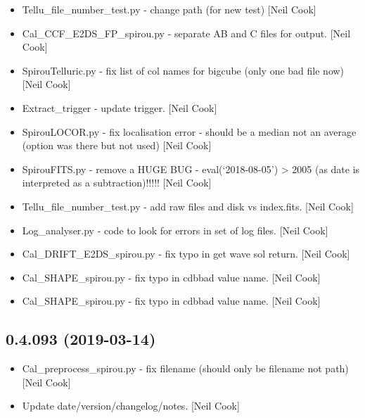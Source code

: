 \documentclass[a4paper,10pt,english]{report}
\begin{document}
\begin{itemize}
\item {} 
Tellu\_file\_number\_test.py - change path (for new test) {[}Neil Cook{]}

\item {} 
Cal\_CCF\_E2DS\_FP\_spirou.py - separate AB and C files for output. {[}Neil
Cook{]}

\item {} 
SpirouTelluric.py - fix list of col names for bigcube (only one bad
file now) {[}Neil Cook{]}

\item {} 
Extract\_trigger - update trigger. {[}Neil Cook{]}

\item {} 
SpirouLOCOR.py - fix localisation error - should be a median not an
average (option was there but not used) {[}Neil Cook{]}

\item {} 
SpirouFITS.py - remove a HUGE BUG - eval(‘2018-08-05’) \textendash{}\textgreater{} 2005 (as
date is interpreted as a subtraction)!!!!! {[}Neil Cook{]}

\item {} 
Tellu\_file\_number\_test.py - add raw files and disk vs index.fits.
{[}Neil Cook{]}

\item {} 
Log\_analyser.py - code to look for errors in set of log files. {[}Neil
Cook{]}

\item {} 
Cal\_DRIFT\_E2DS\_spirou.py - fix typo in get wave sol return. {[}Neil
Cook{]}

\item {} 
Cal\_SHAPE\_spirou.py - fix typo in cdbbad value name. {[}Neil Cook{]}

\item {} 
Cal\_SHAPE\_spirou.py - fix typo in cdbbad value name. {[}Neil Cook{]}

\end{itemize}


\subsection{0.4.093 (2019-03-14)}
\label{\detokenize{misc/changelog:id165}}\begin{itemize}
\item {} 
Cal\_preprocess\_spirou.py - fix filename (should only be filename not
path) {[}Neil Cook{]}

\item {} 
Update date/version/changelog/notes. {[}Neil Cook{]}

\end{itemize}
\end{document}
